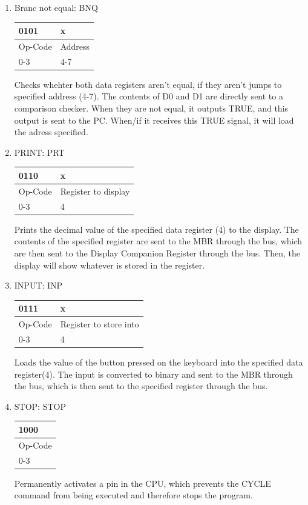\documentclass{mcgillhomework}
\begin{document}
\begin{enumerate}
		\item Branc not equal: BNQ\\
		\begin{tabularx}{\textwidth}{|X|X|}
			\hline 0101 & x
			\\ \hline Op-Code & Address
			\\ \hline 0-3 & 4-7
			\\ \hline
		\end{tabularx}
		Checks whehter both data registers aren't equal, if they aren't jumps to specified address (4-7). The contents of D0 and D1 are directly sent to a comparison checker. When they are not equal, it outputs TRUE, and this output is sent to the PC. When/if it receives this TRUE signal, it will load the adress specified.
		
		\item PRINT: PRT\\
		\begin{tabularx}{\textwidth}{|X|X|}
			\hline 0110 & x
			\\ \hline Op-Code & Register to display
			\\ \hline 0-3 & 4
			\\ \hline
		\end{tabularx}
		Prints the decimal value of the specified data register (4) to the display. The contents of the specified register are sent to the MBR through the bus, which are then sent to the Display Companion Register through the bus. Then, the display will show whatever is stored in the register.
		
		\item INPUT: INP\\
		\begin{tabularx}{\textwidth}{|X|X|}
			\hline 0111 & x
			\\ \hline Op-Code & Register to store into
			\\ \hline 0-3 & 4
			\\ \hline
		\end{tabularx}
		Loads the value of the button pressed on the keyboard into the specified data register(4). The input is converted to binary and sent to the MBR through the bus, which is then sent to the specified register through the bus.
		
		\item STOP: STOP\\
		\begin{tabularx}{\textwidth}{|X|}
			\hline 1000
			\\ \hline Op-Code
			\\ \hline 0-3
			\\ \hline
		\end{tabularx}
		Permanently activates a pin in the CPU, which prevents the CYCLE command from being executed and therefore stops the program.
		

\end{enumerate}
\end{document}
